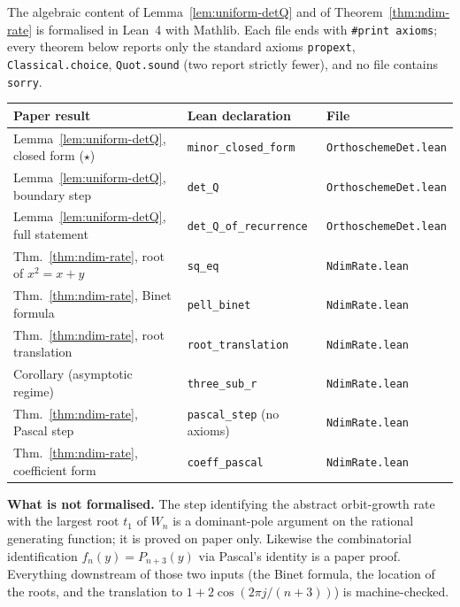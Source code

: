 \documentclass[11pt,a4paper]{article}
\theoremstyle{remark}
\theoremstyle{plain}
\begin{document}
The algebraic content of Lemma~\ref{lem:uniform-detQ} and of
Theorem~\ref{thm:ndim-rate} is formalised in Lean~4 with Mathlib.  Each file
ends with \verb|#print axioms|; every theorem below reports only the standard
axioms \verb|propext|, \verb|Classical.choice|, \verb|Quot.sound| (two report
strictly fewer), and no file contains \verb|sorry|.

\begin{center}\small
\begin{tabular}{lll}
\hline
Paper result & Lean declaration & File \\
\hline
Lemma~\ref{lem:uniform-detQ}, closed form ($\star$)
  & \texttt{minor\_closed\_form} & \texttt{OrthoschemeDet.lean}\\
Lemma~\ref{lem:uniform-detQ}, boundary step
  & \texttt{det\_Q} & \texttt{OrthoschemeDet.lean}\\
Lemma~\ref{lem:uniform-detQ}, full statement
  & \texttt{det\_Q\_of\_recurrence} & \texttt{OrthoschemeDet.lean}\\
Thm.~\ref{thm:ndim-rate}, root of $x^2=x+y$
  & \texttt{sq\_eq} & \texttt{NdimRate.lean}\\
Thm.~\ref{thm:ndim-rate}, Binet formula
  & \texttt{pell\_binet} & \texttt{NdimRate.lean}\\
Thm.~\ref{thm:ndim-rate}, root translation
  & \texttt{root\_translation} & \texttt{NdimRate.lean}\\
Corollary (asymptotic regime)
  & \texttt{three\_sub\_r} & \texttt{NdimRate.lean}\\
Thm.~\ref{thm:ndim-rate}, Pascal step
  & \texttt{pascal\_step} (no axioms) & \texttt{NdimRate.lean}\\
Thm.~\ref{thm:ndim-rate}, coefficient form
  & \texttt{coeff\_pascal} & \texttt{NdimRate.lean}\\
\hline
\end{tabular}
\end{center}

\medskip
\noindent\textbf{What is not formalised.}  The step identifying the abstract
orbit-growth rate with the largest root $t_1$ of $W_n$ is a dominant-pole
argument on the rational generating function; it is proved on paper only.
Likewise the combinatorial identification $f_n(y)=P_{n+3}(y)$ via Pascal's
identity is a paper proof.  Everything downstream of those two inputs (the Binet formula, the location of the roots, and the translation to
$1+2\cos(2\pi j/(n+3))$) is machine-checked.
\end{document}
